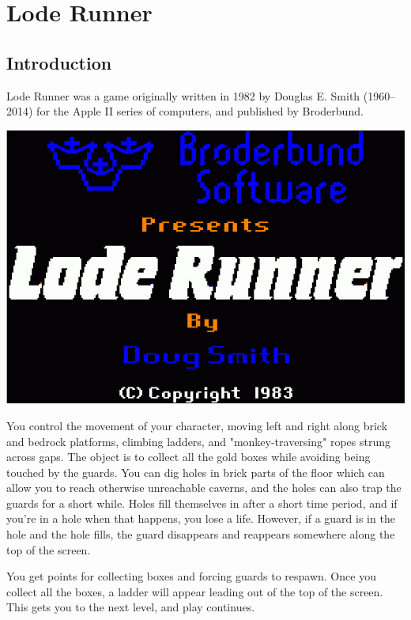 \documentclass[10pt]{report}%
\begin{document}
\pagestyle{noweb}

\chapter{Lode Runner}

\section{Introduction}

Lode Runner was a game originally written in 1982 by Douglas E. Smith (1960--2014) for
the Apple II series of computers, and published by Broderbund.

\begin{center}
\includegraphics[width=\columnwidth]{title-screen}
\end{center}

You control the movement of your character, moving left and right along brick
and bedrock platforms, climbing ladders,
and "monkey-traversing" ropes strung across gaps. The object is to collect all the
gold boxes while avoiding being touched by the guards. You can dig holes in
brick parts of the floor which can allow you to reach otherwise unreachable caverns,
and the holes can also trap the guards for a short while. Holes fill themselves in
after a short time period, and if you're in a hole when that happens, you lose
a life. However, if a guard is in the hole and the hole fills, the guard disappears and
reappears somewhere along the top of the screen.

You get points for collecting boxes and forcing guards to respawn. Once you collect
all the boxes, a ladder will appear leading out of the top of the screen. This
gets you to the next level, and play continues.
\end{document}
